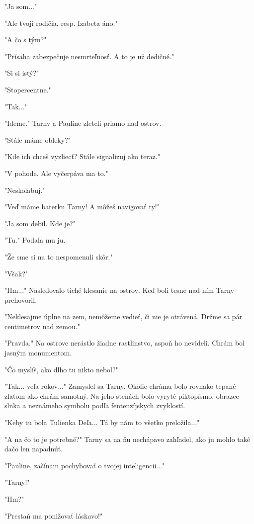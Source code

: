 \documentclass{book}
\begin{document}
"$ $Ja som..."$ $ 

"$ $Ale tvoji rodičia, resp. Izabeta áno."$ $ 

"$ $A čo s tým?"$ $ 

"$ $Prísaha zabezpečuje nesmrteľnosť. A to je už dedičné."$ $ 

"$ $Si si istý?"$ $ 

"$ $Stopercentne."$ $ 

"$ $Tak..."$ $ 

"$ $Ideme."$ $  Tarny a Pauline zleteli priamo nad ostrov.

"$ $Stále máme obleky?"$ $ 

"$ $Kde ich chceš vyzliecť? Stále signalizuj ako teraz."$ $ 

"$ $V pohode. Ale vyčerpáva ma to."$ $ 

"$ $Neskolabuj."$ $ 

"$ $Veď máme baterku Tarny! A môžeš navigovať ty!"$ $ 

"$ $Ja som debil. Kde je?"$ $ 

"$ $Tu."$ $  Podala mu ju.

"$ $Že sme si na to nespomenuli skôr."$ $ 

"$ $Však?"$ $ 

"$ $Hm..."$ $  Nasledovalo tiché klesanie na ostrov. Keď boli tesne nad ním Tarny prehovoril.

"$ $Neklesajme úplne na zem, nemôžeme vedieť, či nie je otrávená. Držme sa pár centimetrov nad zemou."$ $ 

"$ $Pravda."$ $  Na ostrove nerástlo žiadne rastlinstvo, aspoň ho nevideli. Chrám bol jasným monumentom.

"$ $Čo myslíš, ako dlho tu nikto nebol?"$ $ 

"$ $Tak... veľa rokov..."$ $  Zamyslel sa Tarny. Okolie chrámu bolo rovnako tepané zlatom ako chrám samotný. Na jeho stenách bolo vyryté piktopísmo, obrazce slnka a neznámeho symbolu podľa fentenzíjskych zvyklostí.

"$ $Keby tu bola Tulienka Deľa... Tá by nám to všetko preložila..."$ $ 

"$ $A na čo to je potrebné?"$ $  Tarny sa na ňu nechápavo zahľadel, ako ju mohlo také dačo len napadnúť.

"$ $Pauline, začínam pochybovať o tvojej inteligencii..."$ $ 

"$ $Tarny!"$ $ 

"$ $Hm?"$ $ 

"$ $Prestaň ma ponižovať láskavo!"$ $ 
\end{document}
